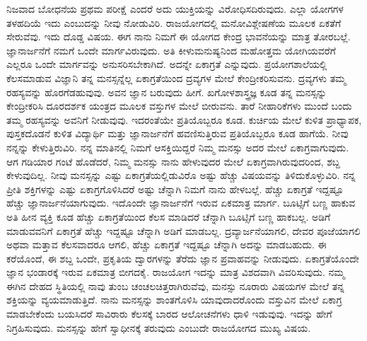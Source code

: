 ನಿಜವಾದ ಬೋಧನೆಯ ಪ್ರಥಮ ಪರೀಕ್ಷೆ ಎಂದರೆ ಅದು ಯುಕ್ತಿಯನ್ನು ವಿರೋಧಿಸದಿರುವುದು. ಎಲ್ಲಾ ಯೋಗಗಳ ತಳಹದಿಯೆ ಇದು ಎಂಬುದನ್ನು ನೀವು ನೋಡುವಿರಿ. ರಾಜಯೋಗದಲ್ಲಿ ಮನೋವಿಶ್ಲೇಷಣೆಯ ಮೂಲಕ ಏಕತೆಗೆ ಸೇರುವೆವು. ಇದು ದೊಡ್ಡ ವಿಷಯ. ಈಗ ನಾನು ನಿಮಗೆ ಈ ಯೋಗದ ಕೇಂದ್ರ ಭಾವನೆಯನ್ನು ಮಾತ್ರ ತೋರಬಲ್ಲೆ. ಜ್ಞಾನಾರ್ಜನೆಗೆ ನಮಗೆ ಒಂದೇ ಮಾರ್ಗವಿರುವುದು. ಅತಿ ಕೀಳುಮನುಷ್ಯನಿಂದ ಮಹೋತ್ತಮ ಯೋಗಿಯವರೆಗೆ ಎಲ್ಲರೂ ಒಂದೇ ಮಾರ್ಗವನ್ನು ಅನುಸರಿಸಬೇಕಾಗಿದೆ. ಅದನ್ನೇ ಏಕಾಗ್ರತೆ ಎನ್ನುವುದು. ಪ್ರಯೋಗಶಾಲೆಯಲ್ಲಿ ಕೆಲಸಮಾಡುವ ವಿಜ್ಞಾನಿ ತನ್ನ ಮನಸ್ಸನ್ನೆಲ್ಲ ಏಕಾಗ್ರತೆಯಿಂದ ದ್ರವ್ಯಗಳ ಮೇಲೆ ಕೇಂದ್ರೀಕರಿಸುವನು. ದ್ರವ್ಯಗಳು ತಮ್ಮ ರಹಸ್ಯವನ್ನು ಹೊರಗೆಡಹುವುವು. ಅವನ ಜ್ಞಾನ ಬರುವುದು ಹೀಗೆ. ಖಗೋಳಶಾಸ್ತ್ರಜ್ಞ ಕೂಡ ತನ್ನ ಮನಸ್ಸನ್ನು ಕೇಂದ್ರೀಕರಿಸಿ ದೂರದರ್ಶಕ ಯಂತ್ರದ ಮೂಲಕ ವಸ್ತುಗಳ ಮೇಲೆ ಬೀರುವನು. ತಾರೆ ನೀಹಾರಿಕೆಗಳು ಮುಂದೆ ಬಂದು ತಮ್ಮ ರಹಸ್ಯವನ್ನು ಅವನಿಗೆ ನೀಡುವುವು. ಇದರಂತೆಯೇ ಪ್ರತಿಯೊಬ್ಬರೂ ಕೂಡ. ಕುರ್ಚಿಯ ಮೇಲೆ ಕುಳಿತ ಪ್ರಾಧ್ಯಾಪಕ, ಪುಸ್ತಕದೊಡನೆ ಕುಳಿತ ವಿದ್ಯಾರ್ಥಿ ಮತ್ತು ಜ್ಞಾನಾರ್ಜನೆಗೆ ಹವಣಿಸುತ್ತಿರುವ ಪ್ರತಿಯೊಬ್ಬರೂ ಕೂಡ ಹಾಗೆಯೆ. ನೀವು ನನ್ನನ್ನು ಕೇಳುತ್ತಿರುವಿರಿ. ನನ್ನ ಮಾತಿನಲ್ಲಿ ನಿಮಗೆ ಆಸಕ್ತಿಯಿದ್ದರೆ ನಿಮ್ಮ ಮನಸ್ಸು ಅದರ ಮೇಲೆ ಏಕಾಗ್ರವಾಗುವುದು. ಆಗ ಗಡಿಯಾರ ಗಂಟೆ ಹೊಡೆದರೆ, ನಿಮ್ಮ ಮನಸ್ಸು ನಾನು ಹೇಳುವುದರ ಮೇಲೆ ಏಕಾಗ್ರವಾಗಿರುವುದರಿಂದ, ಶಬ್ದ ಕೇಳುವುದಿಲ್ಲ. ನೀವು ಮನಸ್ಸನ್ನು ಎಷ್ಟು ಏಕಾಗ್ರತೆಯಲ್ಲಿಡುವಿರೊ ಅಷ್ಟು ಹೆಚ್ಚು ವಿಷಯವನ್ನು ತಿಳಿದುಕೊಳ್ಳುವಿರಿ. ನನ್ನ ಪ್ರೀತಿ ಶಕ್ತಿಗಳನ್ನು ಎಷ್ಟು ಏಕಾಗ್ರಗೊಳಿಸಿದರೆ ಅಷ್ಟು ಚೆನ್ನಾಗಿ ನಿಮಗೆ ನಾನು ಹೇಳಬಲ್ಲೆ. ಹೆಚ್ಚು ಏಕಾಗ್ರತೆ ಇದ್ದಷ್ಟೂ ಹೆಚ್ಚು ಜ್ಞಾನಾರ್ಜನೆಯಾಗುವುದು. ಇದೊಂದೇ ಜ್ಞಾನಾರ್ಜನೆಗೆ ಇರುವ ಏಕಮಾತ್ರ ಮಾರ್ಗ. ಬೂಟ್ಸಿಗೆ ಬಣ್ಣ ಹಾಕುವ ಅತಿ ಹೀನ ವ್ಯಕ್ತಿ ಕೂಡ ಹೆಚ್ಚು ಏಕಾಗ್ರತೆಯಿಂದ ಕೆಲಸ ಮಾಡಿದರೆ ಚೆನ್ನಾಗಿ ಬೂಟ್ಸಿಗೆ ಬಣ್ಣ ಹಾಕಬಲ್ಲ. ಅಡಿಗೆ ಮಾಡುವವನಿಗೆ ಏಕಾಗ್ರತೆ ಹೆಚ್ಚು ಇದ್ದಷ್ಟೂ ಚೆನ್ನಾಗಿ ಅಡಿಗೆ ಮಾಡಬಲ್ಲ. ದ್ರವ್ಯಾರ್ಜನೆಯಾಗಲಿ, ದೇವರ ಪೂಜೆಯಾಗಲಿ ಅಥವಾ ಮತ್ತಾವ ಕೆಲಸವಾದರೂ ಆಗಲಿ, ಹೆಚ್ಚು ಏಕಾಗ್ರತೆ ಇದ್ದಷ್ಟೂ ಚೆನ್ನಾಗಿ ಅದನ್ನು ಮಾಡಬಹುದು. ಈ ಕರೆಯೊಂದೆ, ಈ ಶಬ್ದ ಒಂದೇ, ಪ್ರಕೃತಿಯ ದ್ವಾರಗಳನ್ನು ತೆರೆದು ಜ್ಞಾನ ಪ್ರವಾಹವನ್ನು ನೀಡುವುದು. ಏಕಾಗ್ರತೆಯೊಂದೇ ಜ್ಞಾನ ಭಂಡಾರಕ್ಕೆ ಇರುವ ಏಕಮಾತ್ರ ಬೀಗದಕೈ. ರಾಜಯೋಗ ಇದನ್ನು ಮಾತ್ರ ವಿಶದವಾಗಿ ವಿವರಿಸುವುದು. ನಮ್ಮ ಈಗಿನ ದೇಹದ ಸ್ಥಿತಿಯಲ್ಲಿ ನಾವು ತುಂಬ ಚಂಚಲಚಿತ್ತರಾಗಿರುವೆವು, ಮನಸ್ಸು ನೂರಾರು ವಿಷಯಗಳ ಮೇಲೆ ತನ್ನ ಶಕ್ತಿಯನ್ನು ವ್ಯಯಮಾಡುತ್ತಿದೆ. ನಾನು ಮನಸ್ಸನ್ನು ಶಾಂತಗೊಳಿಸಿ ಯಾವುದಾದರೊಂದು ವಸ್ತುವಿನ ಮೇಲೆ ಏಕಾಗ್ರ ಮಾಡಬೇಕೆಂದು ಬಯಸಿದರೆ ಸಾವಿರಾರು ಕೆಲಸಕ್ಕೆ ಬಾರದ ಆಲೋಚನೆಗಳು ಧಾಳಿ ಇಡುವುವು. ಇದನ್ನು ಹೇಗೆ ನಿಗ್ರಹಿಸುವುದು. ಮನಸ್ಸನ್ನು ಹೇಗೆ ಸ್ವಾಧೀನಕ್ಕೆ ತರುವುದು ಎಂಬುದೇ ರಾಜಯೋಗದ ಮುಖ್ಯ ವಿಷಯ.

